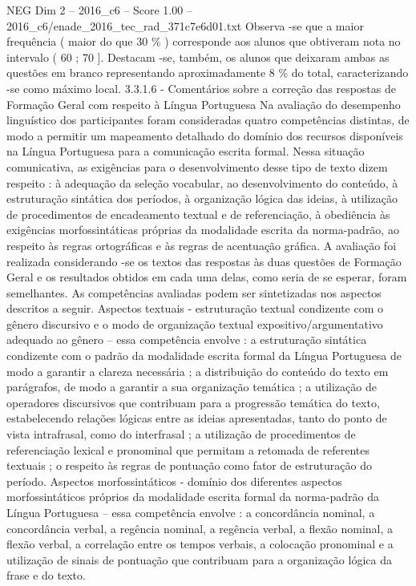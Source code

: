 \begin{textsample}{NEG Dim 2 – 2016\_c6 – Score 1.00 – 2016\_c6/enade\_2016\_tec\_rad\_371c7e6d01.txt}
Observa -se que a maior frequência ( maior do que 30 \% ) corresponde aos alunos que obtiveram nota no intervalo ( 60 ; 70 ].
Destacam -se, também, os alunos que deixaram ambas as questões em branco representando aproximadamente 8 \% do total, caracterizando -se como máximo local. 3.3.1.6 - Comentários sobre a correção das respostas de Formação Geral com respeito à Língua Portuguesa Na avaliação do desempenho linguístico dos participantes foram consideradas quatro competências distintas, de modo a permitir um mapeamento detalhado do domínio dos recursos disponíveis na Língua Portuguesa para a comunicação escrita formal.
Nessa situação comunicativa, as exigências para o desenvolvimento desse tipo de texto dizem respeito : à adequação da seleção vocabular, ao desenvolvimento do conteúdo, à estruturação sintática dos períodos, à organização lógica das ideias, à utilização de procedimentos de encadeamento textual e de referenciação, à obediência às exigências morfossintáticas próprias da modalidade escrita da norma-padrão, ao respeito às regras ortográficas e às regras de acentuação gráfica.
A avaliação foi realizada considerando -se os textos das respostas às duas questões de Formação Geral e os resultados obtidos em cada uma delas, como seria de se esperar, foram semelhantes.
As competências avaliadas podem ser sintetizadas nos aspectos descritos a seguir.
Aspectos textuais - estruturação textual condizente com o gênero discursivo e o modo de organização textual expositivo/argumentativo adequado ao gênero – essa competência envolve : a estruturação sintática condizente com o padrão da modalidade escrita formal da Língua Portuguesa de modo a garantir a clareza necessária ; a distribuição do conteúdo do texto em parágrafos, de modo a garantir a sua organização temática ; a utilização de operadores discursivos que contribuam para a progressão temática do texto, estabelecendo relações lógicas entre as ideias apresentadas, tanto do ponto de vista intrafrasal, como do interfrasal ; a utilização de procedimentos de referenciação lexical e pronominal que permitam a retomada de referentes textuais ; o respeito às regras de pontuação como fator de estruturação do período.
Aspectos morfossintáticos - domínio dos diferentes aspectos morfossintáticos próprios da modalidade escrita formal da norma-padrão da Língua Portuguesa – essa competência envolve : a concordância nominal, a concordância verbal, a regência nominal, a regência verbal, a flexão nominal, a flexão verbal, a correlação entre os tempos verbais, a colocação pronominal e a utilização de sinais de pontuação que contribuam para a organização lógica da frase e do texto.

\end{textsample}
